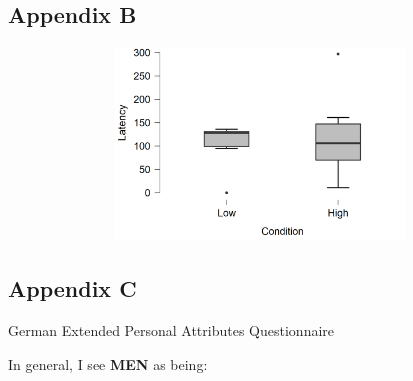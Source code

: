 \documentclass[authordate, serif, review]{jote-article}
\begin{document}

{}
\subsection*{\hypertarget{B}{Appendix B}} 
\begin{Center}

\end{Center}
\begin{figure}[H]
	\centering
	\includegraphics[width=5.54in,height=2.01in]{media/image2.png}
\end{figure}

\newpage
{}
{}
\subsection*{\hypertarget{C}{Appendix C}}

\begin{Center}
German Extended Personal Attributes Questionnaire
\end{Center}

In general, I see \textbf{MEN} as being:



\end{document}
